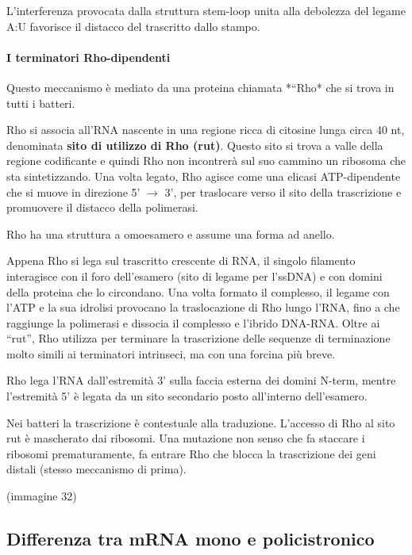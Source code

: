 \documentclass[11pt]{book}
\begin{document}
L'interferenza provocata dalla struttura stem-loop unita alla debolezza
del legame A:U favorisce il distacco del trascritto dallo stampo.

\paragraph{I terminatori
Rho-dipendenti}\label{i-terminatori-rho-dipendenti}

Questo meccanismo è mediato da una proteina chiamata *``Rho* che si
trova in tutti i batteri.

Rho si associa all'RNA nascente in una regione ricca di citosine lunga
circa 40 nt, denominata \textbf{sito di utilizzo di Rho (rut)}. Questo
sito si trova a valle della regione codificante e quindi Rho non
incontrerà sul suo cammino un ribosoma che sta sintetizzando. Una volta
legato, Rho agisce come una elicasi ATP-dipendente che si muove in
direzione 5' \(\rightarrow\) 3', per traslocare verso il sito della
trascrizione e promuovere il distacco della polimerasi.

Rho ha una struttura a omoesamero e assume una forma ad anello.

Appena Rho si lega sul trascritto crescente di RNA, il singolo filamento
interagisce con il foro dell'esamero (sito di legame per l'ssDNA) e con
domini della proteina che lo circondano. Una volta formato il complesso,
il legame con l'ATP e la sua idrolisi provocano la traslocazione di Rho
lungo l'RNA, fino a che raggiunge la polimerasi e dissocia il complesso
e l'ibrido DNA-RNA. Oltre ai ``rut'', Rho utilizza per terminare la
trascrizione delle sequenze di terminazione molto simili ai terminatori
intrinseci, ma con una forcina più breve.

Rho lega l'RNA dall'estremità 3' sulla faccia esterna dei domini N-term,
mentre l'estremità 5' è legata da un sito secondario posto all'interno
dell'esamero.

Nei batteri la trascrizione è contestuale alla traduzione. L'accesso di
Rho al sito rut è mascherato dai ribosomi. Una mutazione non senso che
fa staccare i ribosomi prematuramente, fa entrare Rho che blocca la
trascrizione dei geni distali (stesso meccanismo di prima).

(immagine 32)

\subsection{Differenza tra mRNA mono e
policistronico}\label{differenza-tra-mrna-mono-e-policistronico}
\end{document}
